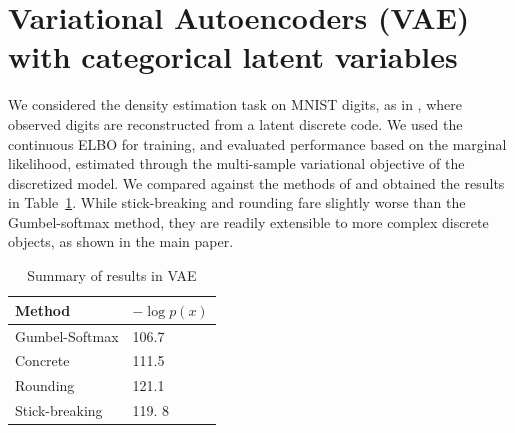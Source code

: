 \documentclass[twoside]{article}
\begin{document}
\section{Variational Autoencoders (VAE) with categorical latent variables}



We considered the density estimation task on MNIST digits, as in
\citet{maddison2016concrete, jang2016categorical}, where observed
digits are reconstructed from a latent discrete code. We used the
continuous ELBO for training, and evaluated performance based on the
marginal likelihood, estimated through the multi-sample variational
objective of the discretized model. We compared against the methods of
\cite{jang2016categorical, maddison2016concrete} and obtained the
results in Table~\ref{tab:vae}.  While stick-breaking and rounding
fare slightly worse than the Gumbel-softmax method, they are readily
extensible to more complex discrete objects, as shown in the main
paper.

\begin{table}[h]
  \caption{Summary of results in VAE}
  \label{tab:vae}
  \centering
  \begin{tabular}{ll}
    \textbf{Method} & $- \log p(x)$ \\
    \hline
    Gumbel-Softmax    & 106.7 \\
    Concrete  &  111.5\\
    Rounding &  121.1 \\
    Stick-breaking & 119. 8\\
    \bottomrule
  \end{tabular}
\end{table}


   
\end{document}
